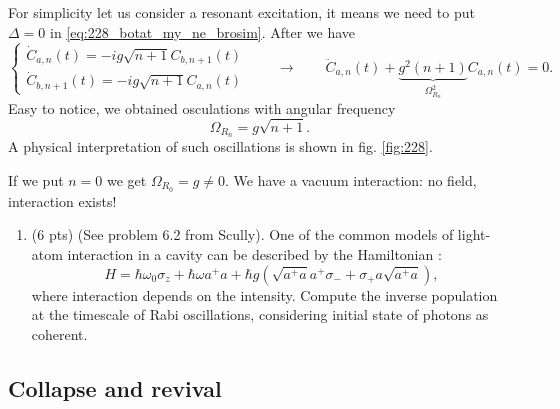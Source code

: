 For simplicity let us consider a resonant excitation, it means we need to put $\Delta  =0$ in \eqref{eq:228_botat_my_ne_brosim}. After we have
\begin{equation}
	\begin{cases}
		\dot{C}_{a,n}(t) = -i g \sqrt{n+1} C_{b,n+1}(t) \\
		\dot{C}_{b,n+1}(t) = -i g \sqrt{n+1} C_{a,n}(t)
	\end{cases} \qquad \to \qquad
	\ddot{C}_{a,n} (t) + \underbrace{g^2(n+1)}_{\Omega_{R_n}^2} C_{a,n}(t) = 0.
\end{equation}
Easy to notice, we obtained osculations with angular frequency
\begin{equation}
	\boxed{\Omega_{R_n} = g \sqrt{n+1}.}
\end{equation}
A physical interpretation of such oscillations is shown in fig. \ref{fig:228}.

\begin{testexample}
	If we put $n=0$ we get $\Omega_{R_0} = g \neq 0$. We have a vacuum interaction: no field, interaction exists!
\end{testexample}



\begin{hw}

	\begin{enumerate}
		\item (6 pts) (See problem 6.2 from Scully). One of the common models of light-atom interaction in a cavity can be described by the Hamiltonian :
		$$
		H=\hbar\omega_{0}\sigma_{z}+ \hbar \omega a^{+}a+\hbar g(\sqrt{a^{+}a}a^{+}\sigma_{-}+\sigma_{+}a\sqrt{a^{+}a}),
		$$
		where interaction depends on the intensity. Compute the inverse population at the timescale of Rabi oscillations, considering  initial state of photons as coherent.
	\end{enumerate}
\end{hw}


\subsection{Collapse and revival}

